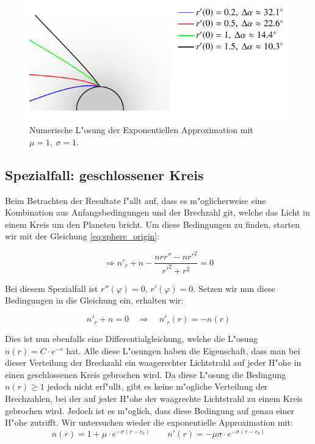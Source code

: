 \begin{refsection}
\begin{figure}
\centering
\includegraphics[scale=1]{licht/standalone/fig_sphere_simulation2.pdf}
\caption{Numerische L"osung der Exponentiellen Approximation mit $\mu = 1, \: \sigma = 1$. \label{fig:sphaerisches_modell3} }
\end{figure}

\newpage

\subsection{Spezialfall: geschlossener Kreis}
Beim Betrachten der Resultate f"allt auf, dass es m"oglicherweise eine Kombination aus Anfangsbedingungen und der Brechzahl git, welche das Licht in einem Kreis um den Planeten bricht. 
Um diese Bedingungen zu finden, starten wir mit der Gleichung \ref{eq:sphere_origin}:

$$\Rightarrow n'_r + n - \frac{n r r'' - n r'^2}{r'^2 + r^2} = 0$$

Bei diesem Spezialfall ist $r''(\varphi) = 0$, $r'(\varphi) = 0$. 
Setzen wir nun diese Bedingungen in die Gleichung ein, erhalten wir:

$$n'_r + n = 0 \quad \Rightarrow \quad n'_r(r) = -n(r)$$

Dies ist nun ebenfalls eine Differentialgleichung, welche die L"osung $n(r) = C \cdot e^{-r}$ hat.
Alle diese L"osungen haben die Eigenschaft, dass man bei dieser Verteilung der Brechzahl ein waagerechter Lichtstrahl auf jeder H"ohe in einen geschlossenen Kreis gebrochen wird.
Da diese L"osung die Bedingung $n(r) \geq 1$ jedoch nicht erf"ullt, gibt es keine m"ogliche Verteilung der Brechzahlen, bei der auf jeder H"ohe der waagrechte Lichtstrahl zu einem Kreis gebrochen wird. 
Jedoch ist es m"oglich, dass diese Bedingung auf genau einer H"ohe zutrifft. 
Wir untersuchen wieder die exponentielle Approximation mit:
$$n(r) = 1 + \mu \cdot e^{-\sigma (r-r_0)} \qquad n'(r) = -\mu \sigma \cdot e^{-\sigma (r-r_0)}$$


\end{refsection}
